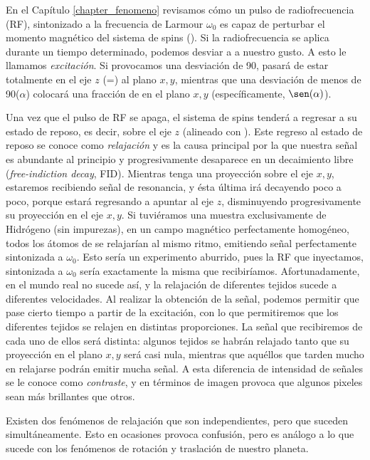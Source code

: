 En el Capítulo \ref{chapter_fenomeno} revisamos cómo un pulso de 
radiofrecuencia (RF), sintonizado a la frecuencia de Larmour $\omega_0$ es 
capaz de perturbar el momento magnético del sistema de spins (\M). Si la 
radiofrecuencia se aplica durante un tiempo determinado, podemos desviar a \M
a nuestro gusto. A esto le llamamos 
\textit{excitación}. Si provocamos una desviación de 90\degrees, \M
pasará de estar totalmente en el eje $z$ (\Mz=\M) al plano $x,y$, mientras que una  desviación de menos de 90\degrees ($\alpha$\degrees) colocará una fracción de \M en el plano $x,y$ (específicamente, $\sen(\alpha)$).

Una vez que el pulso de RF se apaga, el sistema de spins tenderá a regresar a 
su estado de reposo, es decir, sobre el eje $z$ (alineado con \Bzero). Este 
regreso al estado de reposo se conoce como \textit{relajación} y es la causa principal por la que nuestra señal es abundante al principio y progresivamente desaparece en un decaimiento libre (\textit{free-indiction decay}, FID). Mientras  \M tenga una proyección sobre el eje $x,y$, estaremos recibiendo señal de resonancia, y ésta última irá decayendo poco a poco, porque \M estará regresando a apuntar al eje $z$, disminuyendo progresivamente su proyección en el eje $x,y$. Si tuviéramos una muestra exclusivamente de 
Hidrógeno (sin impurezas), en un campo magnético perfectamente homogéneo, todos 
los átomos de  se relajarían al mismo ritmo, emitiendo señal perfectamente 
sintonizada a $\omega_0$. Esto sería un experimento aburrido, pues la RF que 
inyectamos, sintonizada a $\omega_0$ sería exactamente la misma que 
recibiríamos. Afortunadamente, en el mundo real no sucede así, y la relajación 
de diferentes tejidos sucede a diferentes velocidades. Al realizar la obtención 
de la señal, podemos permitir que pase cierto tiempo a partir de la excitación, 
con lo que permitiremos que los diferentes tejidos se relajen en distintas 
proporciones. La señal que recibiremos de cada uno de ellos será 
distinta: algunos tejidos se habrán relajado tanto que su proyección en el 
plano $x,y$ será casi nula, mientras que aquéllos que tarden mucho en relajarse 
podrán emitir mucha señal. A esta diferencia de intensidad de señales se le 
conoce como \textit{contraste}, y en términos de imagen provoca que algunos 
pixeles sean más brillantes que otros.

Existen dos fenómenos de relajación  que son independientes, pero que 
suceden simultáneamente. Esto en ocasiones provoca confusión, pero es análogo a 
lo que sucede con los fenómenos de rotación y traslación de nuestro planeta.


